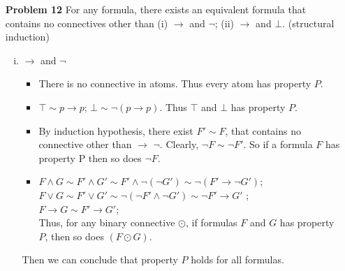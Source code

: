\documentclass[12pt]{article}
\begin{document}
\begin{enumerate}
\item[\textbf{Problem 12}] For any formula, there exists an equivalent formula that contains no connectives other than (i) $\rightarrow $ and $\neg$; (ii) $\rightarrow $ and $\bot$.  (structural induction)
    \begin{enumerate} [(i)]
        \item $\rightarrow $ and $\neg$ 
            \begin{itemize}
                \item There is no connective in atoms. Thus every atom has property $P$. 
                \item $\top \sim p \rightarrow p$; $\bot \sim \neg(p \rightarrow p)$. Thus $\top$ and $\bot$ has property $P$. 
                \item By induction hypothesis, there exist $F' \sim F$, that contains no connective other than $\rightarrow $  $\neg$. Clearly, $\neg F \sim \neg F'$.  So if a formula $F$ has property P then so does $\neg F$. 
                \item $F \wedge G \sim F' \wedge G' \sim F' \wedge \neg (\neg G') \sim \neg ( F' \rightarrow \neg G') $; \\
                 $F \vee G \sim F' \vee G' \sim \neg (\neg F' \wedge \neg G') \sim \neg 
                 F' \rightarrow G' $ ;  \\
                 $F \rightarrow G \sim F' \rightarrow G'$;\\
                  Thus, for any binary connective $\odot$, if formulas $F$ and $G$ has property $P$, then so does $(F \odot G)$. 
            \end{itemize}
       Then we can conclude that property $P$ holds for all formulas.   
       

\end{enumerate}
\end{enumerate}
\end{document}
